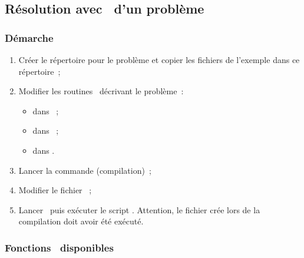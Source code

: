 \subsection{R\'esolution avec \hampath\ d'un probl\`eme}

\subsubsection{D\'emarche}

\begin{enumerate}
    \item Cr\'eer le r\'epertoire pour le probl\`eme et copier les fichiers de l'exemple dans ce r\'epertoire~;
    \item Modifier les routines \fortran\ d\'ecrivant le probl\`eme~:
        \begin{itemize}
            \item {} dans ~;
            \item {} dans ~;
            \item {} dans .
        \end{itemize}
    \item Lancer la commande  (compilation)~;
    \item Modifier le fichier ~;
    \item Lancer \matlab\ puis ex\'ecuter le script .
        Attention, le fichier  cr\'ee lors de la compilation doit avoir \'et\'e ex\'ecut\'e.
\end{enumerate}

\subsubsection{Fonctions \matlab\ disponibles}

